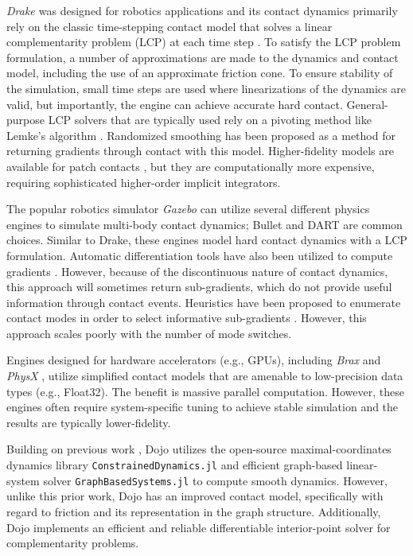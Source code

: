\emph{Drake \cite{drake}} was designed for robotics applications and its contact dynamics primarily rely on the classic time-stepping contact model that solves a linear complementarity problem (LCP) at each time step \cite{stewart1996implicit}. To satisfy the LCP problem formulation, a number of approximations are made to the dynamics and contact model, including the use of an approximate friction cone. To ensure stability of the simulation, small time steps are used where linearizations of the dynamics are valid, but importantly, the engine can achieve accurate hard contact. General-purpose LCP solvers that are typically used rely on a pivoting method like Lemke's algorithm \cite{cottle2009linear}. Randomized smoothing has been proposed as a method for returning gradients through contact \cite{suh2022bundled} with this model. Higher-fidelity models are available for patch contacts \cite{elandt2019pressure}, but they are computationally more expensive, requiring sophisticated higher-order implicit integrators.

The popular robotics simulator \emph{Gazebo} \cite{koenig2004design} can utilize several different physics engines to simulate multi-body contact dynamics; Bullet \cite{heiden2020neuralsim} and DART \cite{lee2018dart} are common choices. Similar to Drake, these engines model hard contact dynamics with a LCP formulation. Automatic differentiation tools have also been utilized to compute gradients \cite{heiden2020neuralsim}. However, because of the discontinuous nature of contact dynamics, this approach will sometimes return sub-gradients, which do not provide useful information through contact events. Heuristics have been proposed to enumerate contact modes in order to select informative sub-gradients \cite{werling2021fast}. However, this approach scales poorly with the number of mode switches.

Engines designed for hardware accelerators (e.g., GPUs), including \emph{Brax} \cite{freeman2021brax} and \emph{PhysX} \cite{physx2022engine}, utilize simplified contact models that are amenable to low-precision data types (e.g., Float32). The benefit is massive parallel computation. However, these engines often require system-specific tuning to achieve stable simulation and the results are typically lower-fidelity.

Building on previous work \cite{brudigam2021linear}, Dojo utilizes the open-source maximal-coordinates dynamics library \texttt{ConstrainedDynamics.jl} and efficient graph-based linear-system solver \texttt{GraphBasedSystems.jl} to compute smooth dynamics. However, unlike this prior work, Dojo has an improved contact model, specifically with regard to friction and its representation in the graph structure. Additionally, Dojo implements an efficient and reliable differentiable interior-point solver for complementarity problems.


